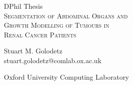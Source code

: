 \begin{titlepage}

\begin{center}

\vspace*{7.5cm}

\normalsize DPhil Thesis\\
\LARGE \textsc{Segmentation of Abdominal Organs and\\Growth Modelling of Tumours in\\Renal Cancer Patients}\\

\vspace{2mm}


\vspace{-5mm}

\large Stuart M. Golodetz\\
\small stuart.golodetz@comlab.ox.ac.uk\\

\vspace{2mm}

\small Oxford University Computing Laboratory

\end{center}

\end{titlepage}